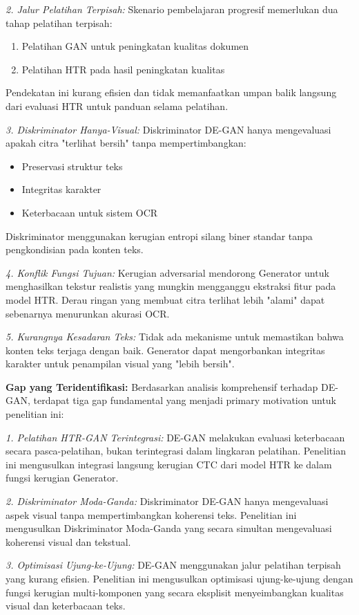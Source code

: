 \documentclass[12pt,a4paper]{article}
\begin{document}
\textit{2. Jalur Pelatihan Terpisah:}
Skenario pembelajaran progresif memerlukan dua tahap pelatihan terpisah:
\begin{enumerate}
    \item Pelatihan GAN untuk peningkatan kualitas dokumen
    \item Pelatihan HTR pada hasil peningkatan kualitas
\end{enumerate}
Pendekatan ini kurang efisien dan tidak memanfaatkan umpan balik langsung dari evaluasi HTR untuk panduan selama pelatihan.

\textit{3. Diskriminator Hanya-Visual:}
Diskriminator DE-GAN hanya mengevaluasi apakah citra "terlihat bersih" tanpa mempertimbangkan:
\begin{itemize}
    \item Preservasi struktur teks
    \item Integritas karakter
    \item Keterbacaan untuk sistem OCR
\end{itemize}
Diskriminator menggunakan kerugian entropi silang biner standar tanpa pengkondisian pada konten teks.

\textit{4. Konflik Fungsi Tujuan:}
Kerugian adversarial mendorong Generator untuk menghasilkan tekstur realistis yang mungkin mengganggu ekstraksi fitur pada model HTR. Derau ringan yang membuat citra terlihat lebih "alami" dapat sebenarnya menurunkan akurasi OCR.

\textit{5. Kurangnya Kesadaran Teks:}
Tidak ada mekanisme untuk memastikan bahwa konten teks terjaga dengan baik. Generator dapat mengorbankan integritas karakter untuk penampilan visual yang "lebih bersih".

\textbf{Gap yang Teridentifikasi:} Berdasarkan analisis komprehensif terhadap DE-GAN, terdapat tiga gap fundamental yang menjadi primary motivation untuk penelitian ini:

\textit{1. Pelatihan HTR-GAN Terintegrasi:} DE-GAN melakukan evaluasi keterbacaan secara pasca-pelatihan, bukan terintegrasi dalam lingkaran pelatihan. Penelitian ini mengusulkan integrasi langsung kerugian CTC dari model HTR ke dalam fungsi kerugian Generator.

\textit{2. Diskriminator Moda-Ganda:} Diskriminator DE-GAN hanya mengevaluasi aspek visual tanpa mempertimbangkan koherensi teks. Penelitian ini mengusulkan Diskriminator Moda-Ganda yang secara simultan mengevaluasi koherensi visual dan tekstual.

\textit{3. Optimisasi Ujung-ke-Ujung:} DE-GAN menggunakan jalur pelatihan terpisah yang kurang efisien. Penelitian ini mengusulkan optimisasi ujung-ke-ujung dengan fungsi kerugian multi-komponen yang secara eksplisit menyeimbangkan kualitas visual dan keterbacaan teks.
\end{document}

